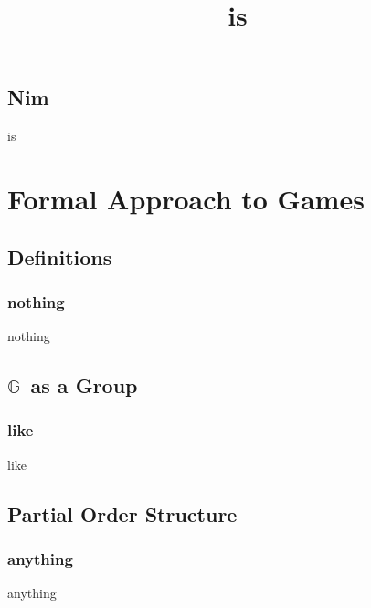 \documentclass[12pt]{beamer}
\begin{document}
\subsection{Nim}
\title{is}
\begin{frame}
is
\end{frame}
\section{Formal Approach to Games}

\subsection{Definitions}
\begin{frame}
\frametitle{nothing}
nothing
\end{frame}

\subsection{$ \mathbb{G}$ \,as a Group}
\begin{frame}
\frametitle{like}
like
\end{frame}

\subsection{Partial Order Structure}
\begin{frame}
\frametitle{anything}
anything
\end{frame}
\end{document}
